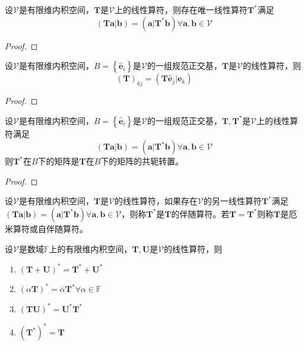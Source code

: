 \documentclass[main.tex]{subfiles}
\begin{document}
\begin{theorem}
设$\mathcal{V}$是有限维内积空间，$\mathbf{T}$是$\mathcal{V}$上的线性算符，则存在唯一线性算符$\mathbf{T}^*$满足
\[\left(\mathbf{Ta}|\mathbf{b}\right)=\left(\mathbf{a}|\mathbf{T}^*\mathbf{b}\right)\forall\mathbf{a},\mathbf{b}\in\mathcal{V}\]
\end{theorem}
\begin{proof}

\end{proof}

\begin{theorem}
设$\mathcal{V}$是有限维内积空间，$B=\left\{\mathbf{\hat{e}}_i\right\}$是$\mathcal{V}$的一组规范正交基，$\mathbf{T}$是$\mathcal{V}$的线性算符，则
\[\left(\mathbf{T}\right)_{kj}=\left(\mathbf{T\hat{e}}_j|\mathbf{e}_k\right)\]
\end{theorem}
\begin{proof}

\end{proof}

\begin{theorem}
设$\mathcal{V}$是有限维内积空间，$B=\left\{\mathbf{\hat{e}}_i\right\}$是$\mathcal{V}$的一组规范正交基，$\mathbf{T},\mathbf{T}^*$是$\mathcal{V}$上的线性算符满足
\[\left(\mathbf{Ta}|\mathbf{b}\right)=\left(\mathbf{a}|\mathbf{T}^*\mathbf{b}\right)\forall\mathbf{a},\mathbf{b}\in\mathcal{V}\]
则$\mathbf{T}^*$在$B$下的矩阵是$\mathbf{T}$在$B$下的矩阵的共轭转置。
\end{theorem}
\begin{proof}

\end{proof}

\begin{definition}[伴随算符]
设$\mathcal{V}$是有限维内积空间，$\mathbf{T}$是$\mathcal{V}$的线性算符，如果存在$\mathcal{V}$的另一线性算符$\mathbf{T}^*$满足$\left(\mathbf{Ta}|\mathbf{b}\right)=\left(\mathbf{a}|\mathbf{T}^*\mathbf{b}\right)\forall\mathbf{a},\mathbf{b}\in\mathcal{V}$，则称$\mathbf{T}^*$是$\mathbf{T}$的伴随算符。若$\mathbf{T}=\mathbf{T}^*$则称$\mathbf{T}$是厄米算符或自伴随算符。
\end{definition}

\begin{theorem}
设$\mathcal{V}$是数域$\mathbb{F}$上的有限维内积空间，$\mathbf{T},\mathbf{U}$是$\mathcal{V}$的线性算符，则
\begin{enumerate}
    \item $\left(\mathbf{T}+\mathbf{U}\right)^*=\mathbf{T}^*+\mathbf{U}^*$
    \item $\left(\alpha\mathbf{T}\right)^*=\overline{\alpha}\mathbf{T}^*\forall\alpha\in\mathbb{F}$
    \item $\left(\mathbf{TU}\right)^*=\mathbf{U}^*\mathbf{T}^*$
    \item $\left(\mathbf{T}^*\right)^*=\mathbf{T}$
\end{enumerate}
\end{theorem}
\end{document}
